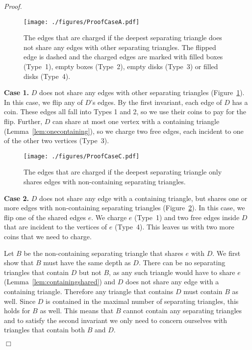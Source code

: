 \pdfoutput=1 \documentclass[12pt]{elsarticle}
\newenvironment{proof}{\emph{Proof.}}{\hfill $\Box$ \medskip\\}
\begin{document}
\begin{proof}
 \begin{figure}[ht]
  \centering
  \texttt{[image: ./figures/ProofCaseA.pdf]}
  \caption{The edges that are charged if the deepest separating triangle does not share any edges with other separating triangles. The flipped edge is dashed and the charged edges are marked with filled boxes (Type~1), empty boxes (Type~2), empty disks (Type~3) or filled disks (Type~4).}
  \label{fig:caseA}
 \end{figure}

 \smallskip
  \textbf{Case 1.} $D$ does not share any edges with other separating triangles (Figure~\ref{fig:caseA}). In this case, we flip any of $D$'s edges. By the first invariant, each edge of $D$ has a coin. These edges all fall into Types 1 and 2, so we use their coins to pay for the flip. Further, $D$ can share at most one vertex with a containing triangle (Lemma~\ref{lem:onecontaining}), so we charge two free edges, each incident to one of the other two vertices (Type~3). 
\newpage
 \begin{figure}[ht]
  \centering
  \texttt{[image: ./figures/ProofCaseC.pdf]}
  \caption{The edges that are charged if the deepest separating triangle only shares edges with non-containing separating triangles.}
  \label{fig:caseC}
 \end{figure}

  \textbf{Case 2.} $D$ does not share any edge with a containing triangle, but shares one or more edges with non-containing separating triangles (Figure~\ref{fig:caseC}). In this case, we flip one of the shared edges $e$. We charge $e$ (Type~1) and two free edges inside $D$ that are incident to the vertices of $e$ (Type~4). This leaves us with two more coins that we need to charge.

  Let $B$ be the non-containing separating triangle that shares $e$ with $D$. We first show that $B$ must have the same depth as $D$. There can be no separating triangles that contain $D$ but not $B$, as any such triangle would have to share $e$ (Lemma~\ref{lem:containingshared}) and $D$ does not share any edge with a containing triangle. Therefore any triangle that contains $D$ must contain $B$ as well. Since $D$ is contained in the maximal number of separating triangles, this holds for $B$ as well. This means that $B$ cannot contain any separating triangles and to satisfy the second invariant we only need to concern ourselves with triangles that contain both $B$ and $D$.


\end{proof}
\end{document}
